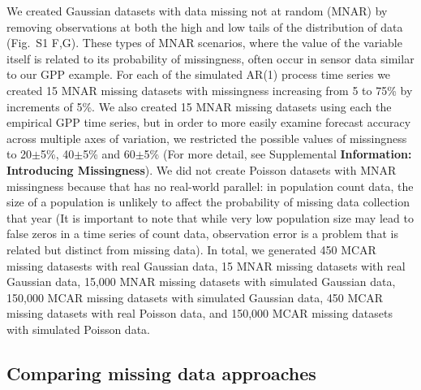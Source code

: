 \documentclass{article}
\begin{document}
We created Gaussian datasets with data missing not at random (MNAR) by removing observations at both the high and low tails of the distribution of data (Fig.\ S1 F,G). These types of MNAR scenarios, where the value of the variable itself is related to its probability of missingness, often occur in sensor data similar to our GPP example. %
For each of the simulated AR(1) process time series we created 15 MNAR missing datasets with missingness increasing from 5 to 75\% by increments of 5\%. We also created 15 MNAR missing datasets using each the empirical GPP time series, but in order to more easily examine forecast accuracy across multiple axes of variation, we restricted the possible values of missingness to 20$\pm$5\%, 40$\pm$5\% and 60$\pm$5\% (For more detail, see Supplemental \textbf{Information: Introducing Missingness}). We did not create Poisson datasets with MNAR missingness because that has no real-world parallel: in population count data, the size of a population is unlikely to affect the probability of missing data collection that year (It is important to note that while very low population size may lead to false zeros in a time series of count data, observation error is a problem that is related but distinct from missing data). In total, we generated 450 MCAR missing datasests with real Gaussian data, 15 MNAR missing datasets with real Gaussian data, 15,000 MNAR missing datasets with simulated Gaussian data, 150,000 MCAR missing datasets with simulated Gaussian data, 450 MCAR missing datasets with real Poisson data, and 150,000 MCAR missing datasets with simulated Poisson data. 


\subsection*{Comparing missing data approaches}
\end{document}
